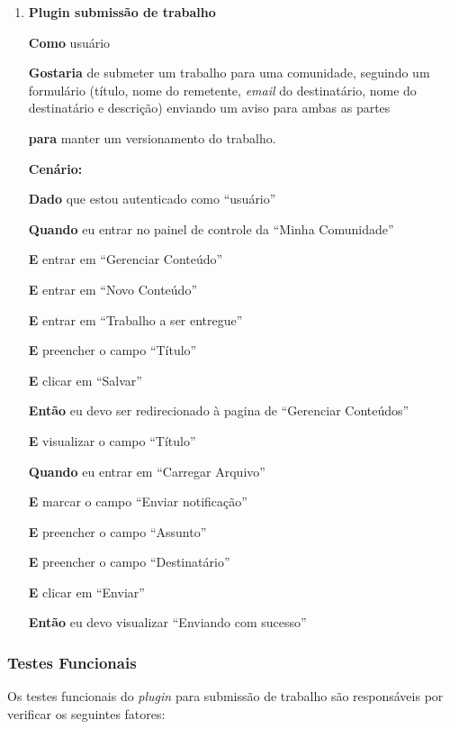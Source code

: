 \begin{enumerate}
\item  \textbf{Plugin submissão de trabalho}

\textbf{Como} usuário

\textbf{Gostaria} de submeter um trabalho para uma comunidade, seguindo um formulário (título, nome do remetente, \textit{email} do destinatário, nome do destinatário e descrição) enviando um aviso para ambas as partes

\textbf{para} manter um versionamento do trabalho.


\textbf{Cenário:}

\textbf{Dado} que estou autenticado como ``usuário''

\textbf{Quando} eu entrar no painel de controle da ``Minha Comunidade''

\textbf{E} entrar em ``Gerenciar Conteúdo''

\textbf{E} entrar em ``Novo Conteúdo''

\textbf{E} entrar em ``Trabalho a ser entregue''

\textbf{E} preencher o campo ``Título''

\textbf{E} clicar em ``Salvar''

\textbf{Então} eu devo ser redirecionado à pagina de ``Gerenciar Conteúdos''

\textbf{E} visualizar o campo ``Título''

\textbf{Quando} eu entrar em ``Carregar Arquivo''

\textbf{E} marcar o campo ``Enviar notificação''

\textbf{E} preencher o campo ``Assunto''

\textbf{E} preencher o campo ``Destinatário''

\textbf{E} clicar em ``Enviar''

\textbf{Então} eu devo visualizar ``Enviando com sucesso''

\end{enumerate}

\subsubsection{Testes Funcionais}

Os testes funcionais do \textit{plugin} para submissão de trabalho são responsáveis por verificar os seguintes fatores:


